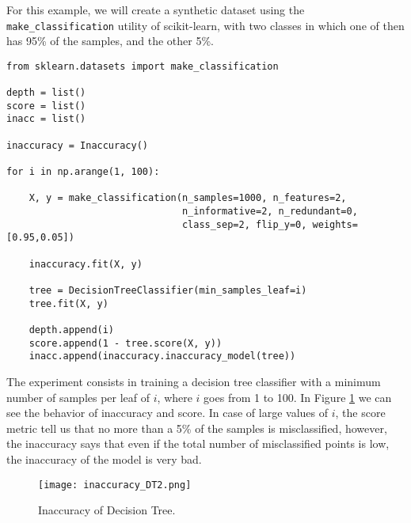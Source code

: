 \begin{example}
\label{ex:machine_learning:inaccuracy:unbalanced_dataset}
For this example, we will create a synthetic dataset using the \texttt{make\_classification} utility of scikit-learn, with two classes in which one of then has 95\% of the samples, and the other 5\%.

\begin{sourcecode}
{\scriptsize \begin{verbatim}
from sklearn.datasets import make_classification

depth = list()
score = list()
inacc = list()

inaccuracy = Inaccuracy()

for i in np.arange(1, 100):
                    
    X, y = make_classification(n_samples=1000, n_features=2,
                               n_informative=2, n_redundant=0,
                               class_sep=2, flip_y=0, weights=[0.95,0.05])

    inaccuracy.fit(X, y)
        
    tree = DecisionTreeClassifier(min_samples_leaf=i)
    tree.fit(X, y)

    depth.append(i)        
    score.append(1 - tree.score(X, y))
    inacc.append(inaccuracy.inaccuracy_model(tree))
\end{verbatim}}
\end{sourcecode}

The experiment consists in training a decision tree classifier with a minimum number of samples per leaf of $i$, where $i$ goes from 1 to 100. In Figure \ref{figure:machine_learning:inaccuracy:inaccuracy_DT2} we can see the behavior of inaccuracy and score. In case of large values of $i$, the score metric tell us that no more than a 5\% of the samples is misclassified, however, the inaccuracy says that even if the total number of misclassified points is low, the inaccuracy of the model is very bad.

\begin{figure}[h]
\centering
\texttt{[image: inaccuracy\_DT2.png]}
\caption{Inaccuracy of Decision Tree.}
\label{figure:machine_learning:inaccuracy:inaccuracy_DT2}
\end{figure}

\end{example}





%
%

